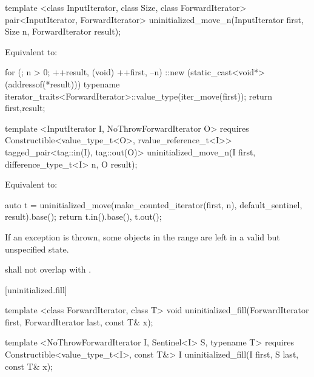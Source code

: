 {\color{remclr}
\begin{codeblock}
template <class InputIterator, class Size, class ForwardIterator>
  pair<InputIterator, ForwardIterator>
    uninitialized_move_n(InputIterator first, Size n, ForwardIterator result);
\end{codeblock}

\setcounter{Paras}{2}
\pnum
\effects Equivalent to:
\begin{codeblock}
        for (; n > 0; ++result, (void) ++first, --n)
          ::new (static_cast<void*>(addressof(*result)))
            typename iterator_traits<ForwardIterator>::value_type(iter_move(first));
        return {first,result};
\end{codeblock}
} %

{\color{addclr}
\begin{codeblock}
template <InputIterator I, NoThrowForwardIterator O>
requires
  Constructible<value_type_t<O>, rvalue_reference_t<I>>
tagged_pair<tag::in(I), tag::out(O)>
  uninitialized_move_n(I first, difference_type_t<I> n, O result);
\end{codeblock}

\pnum
\effects Equivalent to:
\begin{codeblock}
    auto t = uninitialized_move(make_counted_iterator(first, n),
                                default_sentinel{}, result).base();
    return {t.in().base(), t.out()};
\end{codeblock}
} %

\setcounter{Paras}{3}
\pnum
\remarks If an exception is thrown, some objects in the range  are left
in a valid\added{,} but unspecified state.

{\color{addclr}
\setcounter{Paras}{5}
\pnum
\requires {} shall not overlap with .
} %

[uninitialized.fill]{}
{\color{remclr}
\begin{codeblock}
template <class ForwardIterator, class T>
  void uninitialized_fill(ForwardIterator first, ForwardIterator last,
                          const T& x);
\end{codeblock}
} %

{\color{addclr}
\begin{codeblock}
template <NoThrowForwardIterator I, Sentinel<I> S, typename T>
requires
  Constructible<value_type_t<I>, const T&>
I uninitialized_fill(I first, S last, const T& x);
\end{codeblock}
} %

